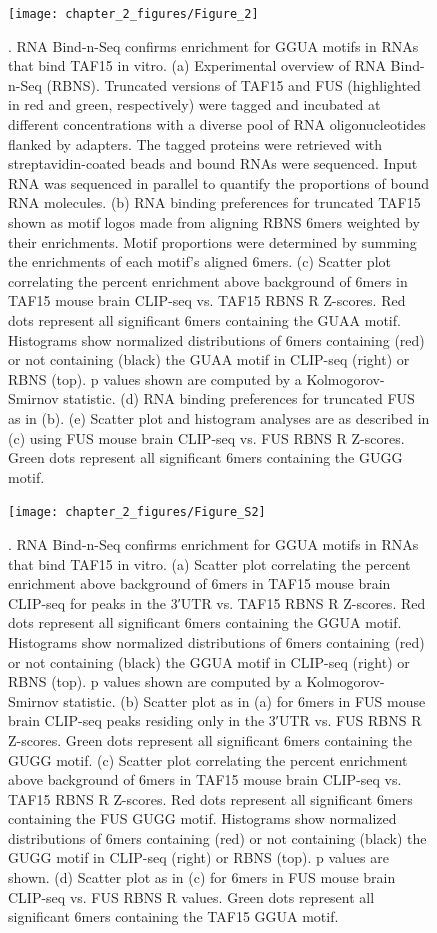 \begin{figure}[ht]
  \centering
  \texttt{[image: chapter\_2\_figures/Figure\_2]}
  \caption[Figure 2]{. RNA Bind-n-Seq confirms enrichment for GGUA motifs in RNAs that bind TAF15 in vitro. (a) Experimental overview of RNA Bind-n-Seq (RBNS). Truncated versions of TAF15 and FUS (highlighted in red and green, respectively) were tagged and incubated at different concentrations with a diverse pool of RNA oligonucleotides flanked by adapters. The tagged proteins were retrieved with streptavidin-coated beads and bound RNAs were sequenced. Input RNA was sequenced in parallel to quantify the proportions of bound RNA molecules. (b) RNA binding preferences for truncated TAF15 shown as motif logos made from aligning RBNS 6mers weighted by their enrichments. Motif proportions were determined by summing the enrichments of each motif’s aligned 6mers. (c) Scatter plot correlating the percent enrichment above background of 6mers in TAF15 mouse brain CLIP-seq vs. TAF15 RBNS R Z-scores. Red dots represent all significant 6mers containing the GUAA motif. Histograms show normalized distributions of 6mers containing (red) or not containing (black) the GUAA motif in CLIP-seq (right) or RBNS (top). p values shown are computed by a Kolmogorov-Smirnov statistic. (d) RNA binding preferences for truncated FUS as in (b). (e) Scatter plot and histogram analyses are as described in (c) using FUS mouse brain CLIP-seq vs. FUS RBNS R Z-scores. Green dots represent all significant 6mers containing the GUGG motif.}
  \label{fig:Figure_2}
\end{figure}

\begin{figure}[ht]
  \centering
  \texttt{[image: chapter\_2\_figures/Figure\_S2]}
  \caption[Supplementary Figure 2]{. RNA Bind-n-Seq confirms enrichment for GGUA motifs in RNAs that bind TAF15 in vitro. (a) Scatter plot correlating the percent enrichment above background of 6mers in TAF15 mouse brain CLIP-seq for peaks in the 3′UTR vs. TAF15 RBNS R Z-scores. Red dots represent all significant 6mers containing the GGUA motif. Histograms show normalized distributions of 6mers containing (red) or not containing (black) the GGUA motif in CLIP-seq (right) or RBNS (top). p values shown are computed by a Kolmogorov-Smirnov statistic. (b) Scatter plot as in (a) for 6mers in FUS mouse brain CLIP-seq peaks residing only in the 3′UTR vs. FUS RBNS R Z-scores. Green dots represent all significant 6mers containing the GUGG motif. (c) Scatter plot correlating the percent enrichment above background of 6mers in TAF15 mouse brain CLIP-seq vs. TAF15 RBNS R Z-scores. Red dots represent all significant 6mers containing the FUS GUGG motif. Histograms show normalized distributions of 6mers containing (red) or not containing (black) the GUGG motif in CLIP-seq (right) or RBNS (top). p values are shown. (d) Scatter plot as in (c) for 6mers in FUS mouse brain CLIP-seq vs. FUS RBNS R values. Green dots represent all significant 6mers containing the TAF15 GGUA motif.}
  \label{fig:Figure_S2}
\end{figure}


